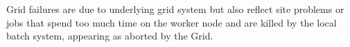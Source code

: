 Grid failures are due to underlying grid system but also reflect site problems or jobs that spend too much time on the worker node and are killed by the local batch system, appearing as aborted by the Grid.


%
%
